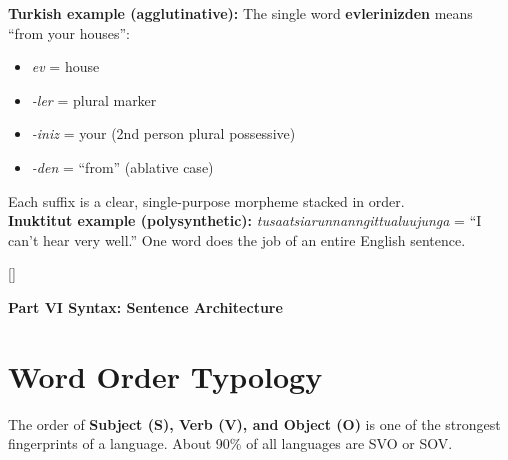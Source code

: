 \documentclass[11pt, letterpaper]{article}
\newcommand{\redsections}{%
  \titleformat{\section}{\large\bfseries\color{sectionred}}{}{0em}{}[\color{sectionred}\titlerule]%
  \titleformat{\subsection}{\normalsize\bfseries\color{sectionred!80!black}}{}{0em}{}%
}
\newcommand{\partbanner}[3]{%
  \begin{tcolorbox}[colback=#1, colframe=#2, boxrule=1.2pt, arc=4pt,
    left=8pt, right=8pt, top=6pt, bottom=6pt]
    \begin{center}{\LARGE\bfseries #3}\end{center}
  \end{tcolorbox}%
}
\begin{document}
\begin{tcolorbox}[colback=part3bg, colframe=sectionpurple, arc=3pt, boxrule=1pt]
\textbf{Turkish example (agglutinative):} The single word \textbf{evlerinizden} means ``from your houses'':
\begin{itemize}[noitemsep, leftmargin=*]
  \item \emph{ev} = house
  \item \emph{-ler} = plural marker
  \item \emph{-iniz} = your (2nd person plural possessive)
  \item \emph{-den} = ``from'' (ablative case)
\end{itemize}
Each suffix is a clear, single-purpose morpheme stacked in order.\\[4pt]
\textbf{Inuktitut example (polysynthetic):} \emph{tusaatsiarunnanngittualuujunga} = ``I can't hear very well.'' One word does the job of an entire English sentence.
\end{tcolorbox}

\newpage

\redsections
{}
\partbanner{part6bg}{sectionred}{Part VI \quad Syntax: Sentence Architecture}

\vspace{8pt}

\section*{Word Order Typology}

The order of \textbf{Subject (S), Verb (V), and Object (O)} is one of the strongest fingerprints of a language. About 90\% of all languages are SVO or SOV.
\end{document}
